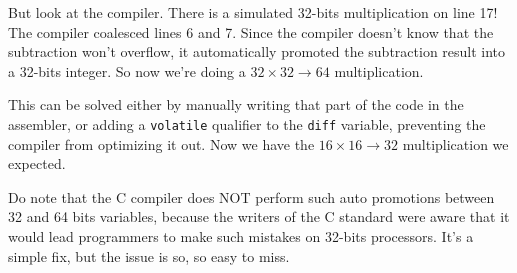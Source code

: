 But look at the compiler. There is a simulated 32-bits multiplication on line 17! The compiler coalesced lines 6 and 7. Since the compiler doesn't know that the subtraction won't overflow, it automatically promoted the subtraction result into a 32-bits integer. So now we're doing a $32 \times 32 \to 64$ multiplication.

This can be solved either by manually writing that part of the code in the assembler, or adding a \verb|volatile| qualifier to the \verb|diff| variable, preventing the compiler from optimizing it out. Now we have the $16 \times 16 \to 32$ multiplication we expected.

Do note that the C compiler does NOT perform such auto promotions between 32 and 64 bits variables, because the writers of the C standard were aware that it would lead programmers to make such mistakes on 32-bits processors. It's a simple fix, but the issue is so, so easy to miss.